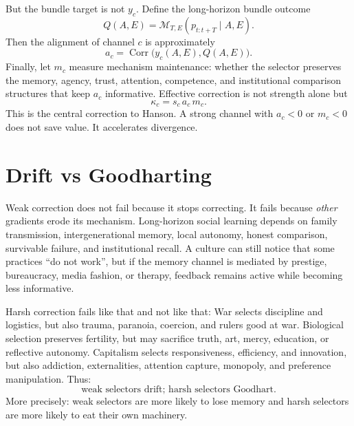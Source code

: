 \documentclass[10pt,twocolumn]{article}
\begin{document}
But the bundle target is not $y_c$. Define the long-horizon bundle outcome
\begin{equation}
Q(A,E) = \mathcal M_{T,E}(p_{t:t+T}\mid A,E).
\end{equation}
Then the alignment of channel $c$ is approximately
\begin{equation}
a_c = \operatorname{Corr}\big(y_c(A,E), Q(A,E)\big).
\end{equation}
Finally, let $m_c$ measure mechanism maintenance: whether the selector preserves the memory, agency, trust, attention, competence, and institutional comparison structures that keep $a_c$ informative. Effective correction is not strength alone but
\begin{equation}
\kappa_c = s_c\, a_c\, m_c.
\end{equation}
This is the central correction to Hanson. A strong channel with $a_c<0$ or $m_c<0$ does not save value. It accelerates divergence.

\section{Drift vs Goodharting}
Weak correction does not fail because it stops correcting. 
It fails because \emph{other} gradients erode its mechanism. 
Long-horizon social learning depends on family transmission, intergenerational memory, local autonomy, honest comparison, survivable failure, and institutional recall. 
A culture can still notice that some practices ``do not work'', but if the memory channel is mediated by prestige, bureaucracy, media fashion, or therapy, feedback remains active while becoming less informative.

Harsh correction fails like that and not like that: War selects discipline and logistics, but also trauma, paranoia, coercion, and rulers good at war. 
Biological selection preserves fertility, but may sacrifice truth, art, mercy, education, or reflective autonomy. 
Capitalism selects responsiveness, efficiency, and innovation, but also addiction, externalities, attention capture, monopoly, and preference manipulation. 
Thus:
\begin{equation}
\text{weak selectors drift; harsh selectors Goodhart.}
\end{equation}
More precisely: weak selectors are more likely to lose memory and harsh selectors are more likely to eat their own machinery.
\end{document}
